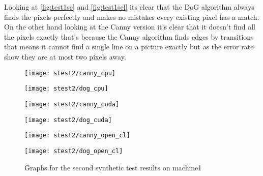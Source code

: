 Looking at \autoref{fig:test1se} and \autoref{fig:test1sel} its clear that the \ac{DoG} algorithm always finds the pixels perfectly and makes no mistakes every existing pixel has a match. On the other hand looking at the \ac{Canny} version it's clear that it doesn't find all the pixels exactly that's because the \ac{Canny} algorithm finds edges by transitions that means it cannot find a single line on a picture exactly but as the error rate show they are at most two pixels away.

\clearpage

\begin{figure}[H]
\centering
\begin{minipage}[t]{.49\textwidth}
\centering
\texttt{[image: stest2/canny\_cpu]}
\end{minipage}
\begin{minipage}[t]{.49\textwidth}
\centering
\texttt{[image: stest2/dog\_cpu]}
\end{minipage}
\begin{minipage}[t]{.49\textwidth}
\centering
\texttt{[image: stest2/canny\_cuda]}
\end{minipage}
\begin{minipage}[t]{.49\textwidth}
\centering
\texttt{[image: stest2/dog\_cuda]}
\end{minipage}
\begin{minipage}[t]{.49\textwidth}
\centering
\texttt{[image: stest2/canny\_open\_cl]}
\end{minipage}
\begin{minipage}[t]{.49\textwidth}
\centering
\texttt{[image: stest2/dog\_open\_cl]}
\end{minipage}
\caption{Graphs for the second synthetic test results on machine1}
\label{fig:test2s}
\end{figure}

